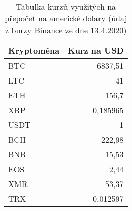 \begin{table}\centering
\caption{Tabulka kurzů využitých na přepočet na americké dolary (údaj z burzy Binance ze dne 13.4.2020)}
\label{table_rates}
\begin{tabular}{|| l | r ||}
\hline Kryptoměna & Kurz na USD \\ 
\hline\hline BTC & 6837,51 \\ 
\hline LTC & 41 \\ 
\hline ETH & 156,7 \\ 
\hline XRP & 0,185965 \\ 
\hline USDT & 1 \\ 
\hline BCH & 222,98 \\ 
\hline BNB & 15,53 \\ 
\hline EOS & 2,44 \\ 
\hline XMR & 53,37 \\ 
\hline TRX & 0,012597 \\ 
\hline
\end{tabular}
\end{table}